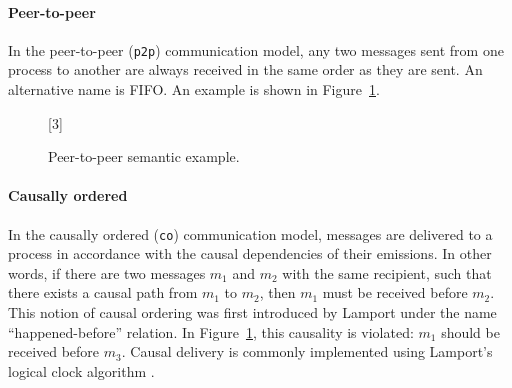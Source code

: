 
\paragraph{Peer-to-peer} 
In the peer-to-peer (\verb|p2p|) communication model, any two messages sent from one 
process to another are always received in the same order as they are sent.
An alternative name is FIFO. An example is shown in Figure~\ref{fig:p2p}.

\begin{figure}[!ht]
    \centering
      \begin{msc}[draw frame=none, draw head=none, msc keyword=, 
                    head height=0px, label distance=0.5ex, 
                    foot height=0px, foot distance=0px]{}

            [3]
            \nextlevel
            \nextlevel
        \end{msc}
  \caption{Peer-to-peer semantic example.}
  \label{fig:p2p}
\end{figure}

\paragraph{Causally ordered}
In the causally ordered (\verb|co|) communication model, messages are delivered 
to a process in accordance with the causal dependencies of their emissions. 
In other words, if there are two messages $m_1$ and $m_2$ with the same recipient, 
such that there exists a causal path from $m_1$ to $m_2$, then $m_1$ must be received 
before $m_2$. This notion of causal ordering was first introduced by Lamport under the 
name ``happened-before'' relation. In Figure~\ref{fig:p2p}, this 
causality is violated: $m_1$ should be received before $m_3$. Causal delivery 
is commonly implemented using Lamport's logical clock algorithm \cite{lamport2019time}.

